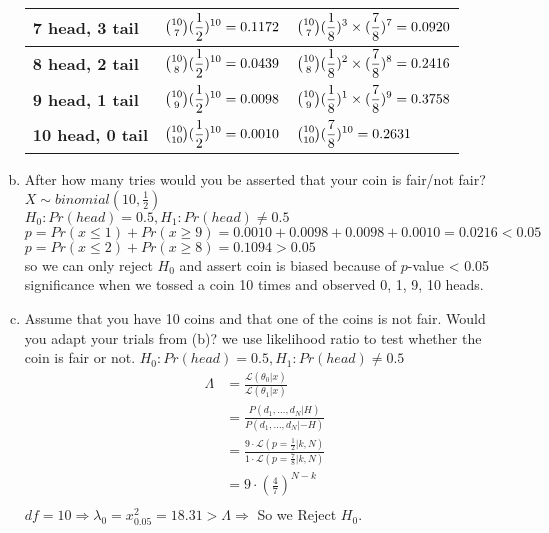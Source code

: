 \documentclass{article}
\begin{document}
\begin{flushleft}
\begin{enumerate}[(a)]
\begin{tabular}{|m{10em}|m{10em}|m{15em}|}
    \hline
    \textbf{7 head, 3 tail} & $\tbinom{10}{7}(\displaystyle\frac{1}{2})^{10} = 0.1172$ & $\tbinom{10}{7}(\displaystyle\frac{1}{8})^{3} \times (\frac{7}{8})^7 = 0.0920$ \\
    \hline
    \textbf{8 head, 2 tail} & $\tbinom{10}{8}(\displaystyle\frac{1}{2})^{10} = 0.0439$ & $\tbinom{10}{8}(\displaystyle\frac{1}{8})^{2} \times (\frac{7}{8})^8 = 0.2416$ \\
    \hline
    \textbf{9 head, 1 tail} & $\tbinom{10}{9}(\displaystyle\frac{1}{2})^{10} = 0.0098$ & $\tbinom{10}{9}(\displaystyle\frac{1}{8})^{1} \times (\frac{7}{8})^9 = 0.3758$ \\
    \hline
    \textbf{10 head, 0 tail} & $\tbinom{10}{10}(\displaystyle\frac{1}{2})^{10} = 0.0010$ & $\tbinom{10}{10}(\displaystyle\frac{7}{8})^{10} = 0.2631$ \\  
    \hline
    \end{tabular}
    \item After how many tries would you be asserted that your coin is fair/not fair?
    \newline
    $X \sim binomial(10, \frac{1}{2})$ \\
    $H_0: Pr(head) = 0.5, H_1: Pr(head) \neq 0.5$ \\
    $p = Pr(x \leq 1) + Pr(x \geq 9) = 0.0010 + 0.0098 + 0.0098 + 0.0010 = 0.0216 < 0.05$ \\
    $p = Pr(x \leq 2) + Pr(x \geq 8) = 0.1094 > 0.05$ \\
    so we can only reject $H_0$ and assert coin is biased because of $p$-value < 0.05 significance when we tossed a coin 10 times and observed 0, 1, 9, 10 heads.
    \item Assume that you have 10 coins and that one of the coins is not fair. Would you adapt your
    trials from (b)?
    we use likelihood ratio to test whether the coin is fair or not.
    $H_0: Pr(head) = 0.5, H_1: Pr(head) \neq 0.5$ \\
    \begin{align*}
        \Lambda &= \frac{\mathcal{L} (\theta_0|x)}{\mathcal{L} (\theta_1|x)} \\
        &= \frac{P(d_1,\dots,d_N|H)}{P(d_1,\dots,d_N|-H)} \\
        & = \frac{9 \cdot \mathcal{L}(p = \frac{1}{2}|k, N)}{1 \cdot \mathcal{L}(p = \frac{7}{8}|k, N)} \\
        &= 9 \cdot (\frac{4}{7})^{N-k} \\
    \end{align*}
    $df = 10 \Longrightarrow \lambda_0 = x_{0.05}^2 = 18.31 > \Lambda \Longrightarrow $ So we Reject $H_0$.

\end{enumerate}
\end{flushleft}
\end{document}
